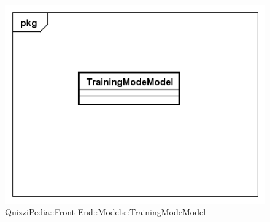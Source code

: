 		\label{QuizziPedia::Front-End::Models::TrainingModeModel}
		
		\begin{figure}[ht]
			\centering
			\includegraphics[scale=0.5,keepaspectratio]{UML/Classi/Front-End/QuizziPedia_Front-end_Models_TrainingModeModel.png}
			\caption{QuizziPedia::Front-End::Models::TrainingModeModel}
		\end{figure} \FloatBarrier
		
